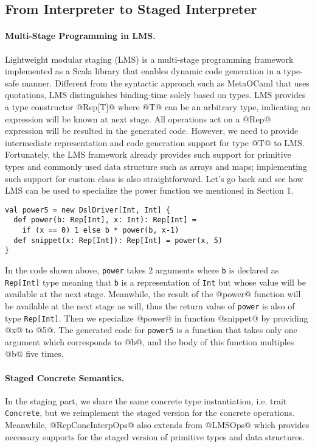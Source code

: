 \subsection{From Interpreter to Staged Interpreter} \label{stagedinterp}

\paragraph{Multi-Stage Programming in LMS.}
Lightweight modular staging (LMS) \cite{DBLP:conf/gpce/RompfO10} is a multi-stage programming framework implemented 
as a Scala library that enables dynamic code generation in a type-safe manner.
Different from the syntactic approach such as MetaOCaml \cite{DBLP:conf/flops/Kiselyov14} that uses quotations, 
LMS distinguishes binding-time solely based on types.
LMS provides a type constructor @Rep[T]@ where @T@ can be an arbitrary type, indicating an expression will be 
known at next stage. All operations act on a @Rep@ expression will be resulted in the generated code. However,
we need to provide intermediate representation and code generation support for type @T@ to LMS. 
Fortunately, the LMS framework already provides
such support for primitive types and commonly used data structure such as arrays and maps; implementing such support
for custom class is also straightforward. Let's go back and see how LMS can be used to specialize the power function
we mentioned in Section 1.

\begin{lstlisting}
val power5 = new DslDriver[Int, Int] {
  def power(b: Rep[Int], x: Int): Rep[Int] =
    if (x == 0) 1 else b * power(b, x-1)
  def snippet(x: Rep[Int]): Rep[Int] = power(x, 5)
}
\end{lstlisting}

In the code shown above, \texttt{power} takes 2 arguments where \texttt{b} is declared as \texttt{Rep[Int]} type 
meaning that \texttt{b} is a representation of \texttt{Int} but whose value will be available at the next stage. 
Meanwhile, the result of the @power@ function will be available at the next stage as will, thus the return value 
of \texttt{power} is also of type \texttt{Rep[Int]}. 
Then we specialize @power@ in function @snippet@ by providing @x@ to @5@.
The generated code for \texttt{power5} is a function that takes only one argument which corresponds to @b@,
and the body of this function multiples @b@ five times.

\paragraph{Staged Concrete Semantics.} In the staging part, we share the same concrete type instantiation, 
i.e. trait \texttt{Concrete}, but we reimplement the staged version for the concrete operations.
Meanwhile, @RepConcInterpOps@ also extends from @LMSOps@ which provides necessary supports for the 
staged version of primitive types and data structures. 

